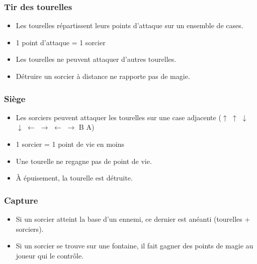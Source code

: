 \documentclass{beamer}
\begin{document}
\begin{frame}
	\frametitle{Tir des tourelles}
	\begin{itemize}
	\item Les tourelles répartissent leurs points d'attaque sur un ensemble de cases.
	\item 1 point d'attaque = 1 sorcier
	\item Les tourelles ne peuvent attaquer d'autres tourelles.
	\item Détruire un sorcier à distance ne rapporte pas de magie.
	\end{itemize}
\end{frame}

\begin{frame}
	\frametitle{Siège}
	\begin{itemize}
	\item Les sorciers peuvent attaquer les tourelles sur une case adjacente ($\uparrow$ $\uparrow$ $\downarrow$ $\downarrow$ $\leftarrow$ $\rightarrow$ $\leftarrow$ $\rightarrow$ B A)
	\item 1 sorcier = 1 point de vie en moins
	\item Une tourelle ne regagne pas de point de vie.
	\item À épuisement, la tourelle est détruite.
	\end{itemize}
\end{frame}

\begin{frame}
	\frametitle{Capture}
	\begin{itemize}
	\item Si un sorcier atteint la base d'un ennemi, ce dernier est anéanti (tourelles + sorciers).
	\item Si un sorcier se trouve sur une fontaine, il fait gagner des points de magie au joueur qui le contrôle.
	\end{itemize}
\end{frame}
\end{document}
